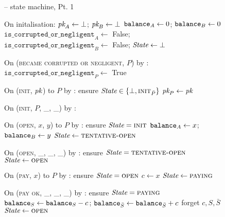 \begin{figure}[H]
  \begin{systembox}{\fchan -- state machine, Pt. 1}
    \begin{algorithmic}[1]
      \State On initalisation:
      \Indent
        \State $\textit{pk}_{A} \gets \bot$; $\textit{pk}_{B} \gets \bot$
        \State $\texttt{balance}_{A} \gets 0$; $\texttt{balance}_{B} \gets 0$
        \State $\texttt{is\_corrupted\_or\_negligent}_A \gets$ False;
        $\texttt{is\_corrupted\_or\_negligent}_B \gets$ False;
        \State $\itistate \gets \bot$
      \EndIndent
      \Statex

      \State On (\textsc{became corrupted or negligent}, $P$) by \adversary:
      \Indent
        \State $\texttt{is\_corrupted\_or\_negligent}_P \gets$ True
      \EndIndent
      \Statex

      \State On (\textsc{init}, $\textit{pk}_{}$) to $P$ by \environment:
      \Indent
        \State ensure $\itistate \in \{\bot, \textsc{init}_{\bar{P}}\}$
        \State $\textit{pk}_{P} \gets \textit{pk}_{}$
      \EndIndent
      \Statex

      \State On (\textsc{init}, $P$, \_, \_) by \adversary: 
      \Indent
      \EndIndent
      \Statex

      \State On (\textsc{open}, $x$, $y$) to $P$ by
      \environment:
      \Indent
        \State ensure $\itistate = \textsc{init}$
        \State $\texttt{balance}_{A} \gets x$; $\texttt{balance}_{B} \gets y$
        \State $\itistate \gets \textsc{tentative-open}$
      \EndIndent
      \Statex

      \State On (\textsc{open}, \_, \_, \_) by \adversary:
      \Indent
        \State ensure $\itistate = \textsc{tentative-open}$
        \State $\itistate \gets \textsc{open}$
      \EndIndent
      \Statex

      \State On (\textsc{pay}, $x$) to $P$ by \environment:
      \Indent
        \State ensure $\itistate = \textsc{open}$
        \State $c \gets x$
        \State $\itistate \gets \textsc{paying}$
      \EndIndent
      \Statex

      \State On (\textsc{pay ok}, \_, \_, \_) by \adversary:
      \Indent
        \State ensure $\itistate = \textsc{paying}$
        \State $\texttt{balance}_{S} \gets \texttt{balance}_{S} - c$; $\texttt{balance}_{\bar{S}} \gets
        \texttt{balance}_{\bar{S}} + c$
        \State forget $c, S, \bar{S}$
        \State $\itistate \gets \textsc{open}$
      \EndIndent
    \end{algorithmic}
  \end{systembox}
  \caption{}
  \label{code:functionality:state-machine-1}
\end{figure}

